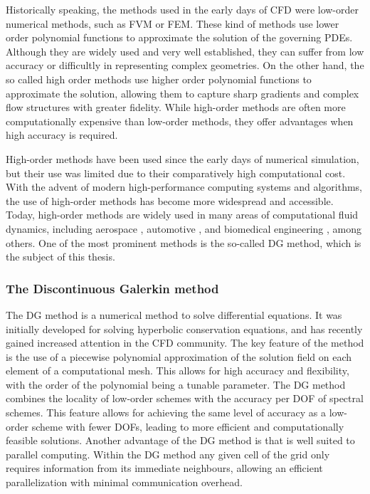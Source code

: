 Historically speaking, the methods used in the early days of CFD were low-order numerical methods, such as \gls{FVM} or \gls{FEM}. These kind of methods use lower order polynomial functions to approximate the solution of the governing \glspl{PDE}. Although they are widely used and very well established, they can suffer from  low accuracy or difficultly in representing complex geometries. On the other hand, the so called high order methods use higher order polynomial functions to approximate the solution, allowing them to capture sharp gradients and complex flow structures with greater fidelity. While high-order methods are often more computationally expensive than low-order methods, they offer advantages when high accuracy is required.

High-order methods have been used since the early days of numerical simulation, but their use was limited due to their comparatively high computational cost. With the advent of modern high-performance computing systems and algorithms, the use of high-order methods has become more widespread and accessible. Today, high-order methods are widely used in many areas of computational fluid dynamics, including aerospace \parencite{mavriplisProgessHighOrderDiscontinuous2009}, automotive \parencite{colomboAssessmentDiscontinuousGalerkin2021}, and biomedical engineering \parencite{fehnModernDiscontinuousGalerkin2019}, among others. One of the most prominent methods is the so-called \gls{DG} method, which is the subject of this thesis.

\subsubsection{The Discontinuous Galerkin method}
The \gls{DG} method is a numerical method to solve differential equations. It was initially developed for solving hyperbolic conservation equations, and has recently gained increased attention in the \gls{CFD} community. The key feature of the method is the use of a piecewise polynomial approximation of the solution field on each element of a computational mesh. This allows for high accuracy and flexibility, with the order of the polynomial being a tunable parameter. 
The DG method combines the locality of low-order schemes with the accuracy per \gls{DOF} of spectral schemes. This feature allows for achieving the same level of accuracy as a low-order scheme with fewer \glspl{DOF}, leading to more efficient and computationally feasible solutions.  Another advantage of the  DG method is that is well suited to parallel computing. Within the DG method any given cell of the grid only requires information from its immediate neighbours, allowing an efficient parallelization with minimal communication overhead.

